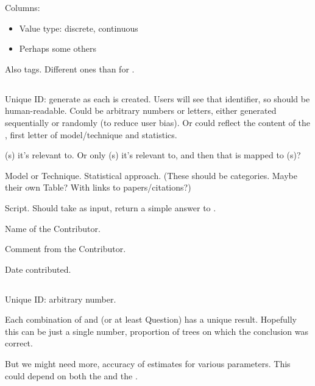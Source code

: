 Columns:
\begin{itemize}
    \item Value type: discrete, continuous
    \item Perhaps some others
\end{itemize}

Also tags.  Different ones than for \Trees.

\subsection{\Method}

Unique ID: generate as each \Method is created.
Users will see that identifier, so should be human-readable.
Could be arbitrary numbers or letters, either generated sequentially or randomly (to reduce user bias).
Or could reflect the content of the \Method, \eg first letter of model/technique and statistics.

\Task(s) it's relevant to.
Or only \Refset(s) it's relevant to, and then that is mapped to \Task(s)?

Model or Technique.
Statistical approach.
(These should be categories.  Maybe their own Table?  With links to papers/citations?)

Script.
Should take \Element as input, return a simple answer to \Task.

    \item Name of the Contributor.
    \item Comment from the Contributor.
    \item Date contributed.

\subsection{\Performance}

Unique ID: arbitrary number.

Each combination of \Method and \Task (or at least Question) has a unique \Performance result.
Hopefully this can be just a single number, \eg proportion of trees on which the conclusion was correct.

But we might need more, \eg accuracy of estimates for various parameters.
This could depend on both the \Method and the \Question.

